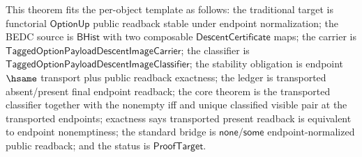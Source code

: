 \begin{theorem}
\label{thm:tagged-option-composite-image-classifier-transported-nonempty-public-readback}
This theorem fits the per-object template as follows: the traditional target is
functorial $\mathsf{OptionUp}$ public readback stable under endpoint
normalization; the BEDC source is $\mathsf{BHist}$ with two composable
$\mathsf{DescentCertificate}$ maps; the carrier is
$\mathsf{TaggedOptionPayloadDescentImageCarrier}$; the classifier is
$\mathsf{TaggedOptionPayloadDescentImageClassifier}$; the stability obligation is
endpoint $\hsame$ transport plus public readback exactness; the ledger is
transported absent/present final endpoint readback; the core theorem is the
transported classifier together with the nonempty iff and unique classified
visible pair at the transported endpoints; exactness says transported present
readback is equivalent to endpoint nonemptiness; the standard bridge is
$\mathsf{none}$/$\mathsf{some}$ endpoint-normalized public readback; and the
status is $\mathsf{ProofTarget}$.


\end{theorem}
